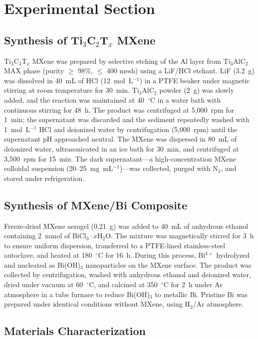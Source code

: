 \section{Experimental Section}

\subsection{Synthesis of Ti$_{3}$C$_{2}$T$_{x}$ MXene}

Ti$_{3}$C$_{2}$T$_{x}$ MXene was prepared by selective etching of the Al layer from Ti$_{3}$AlC$_{2}$ MAX phase (purity $\geq$ 98\%, $\leq$ 400 mesh) using a LiF/HCl etchant. LiF (3.2~g) was dissolved in 40~mL of HCl (12~mol~L$^{-1}$) in a PTFE beaker under magnetic stirring at room temperature for 30~min. Ti$_{3}$AlC$_{2}$ powder (2~g) was slowly added, and the reaction was maintained at 40~$^{\circ}$C in a water bath with continuous stirring for 48~h. The product was centrifuged at 5,000~rpm for 1~min; the supernatant was discarded and the sediment repeatedly washed with 1~mol~L$^{-1}$ HCl and deionized water by centrifugation (5,000~rpm) until the supernatant pH approached neutral. The MXene was dispersed in 80~mL of deionized water, ultrasonicated in an ice bath for 30~min, and centrifuged at 3,500~rpm for 15~min. The dark supernatant---a high-concentration MXene colloidal suspension (20--25~mg~mL$^{-1}$)---was collected, purged with N$_{2}$, and stored under refrigeration.

\subsection{Synthesis of MXene/Bi Composite}

Freeze-dried MXene aerogel (0.21~g) was added to 40~mL of anhydrous ethanol containing 2~mmol of BiCl$_{3}\cdot x$H$_{2}$O. The mixture was magnetically stirred for 3~h to ensure uniform dispersion, transferred to a PTFE-lined stainless-steel autoclave, and heated at 180~$^{\circ}$C for 16~h. During this process, Bi$^{3+}$ hydrolyzed and nucleated as Bi(OH)$_{3}$ nanoparticles on the MXene surface. The product was collected by centrifugation, washed with anhydrous ethanol and deionized water, dried under vacuum at 60~$^{\circ}$C, and calcined at 350~$^{\circ}$C for 2~h under Ar atmosphere in a tube furnace to reduce Bi(OH)$_{3}$ to metallic Bi. Pristine Bi was prepared under identical conditions without MXene, using H$_{2}$/Ar atmosphere.

\subsection{Materials Characterization}

